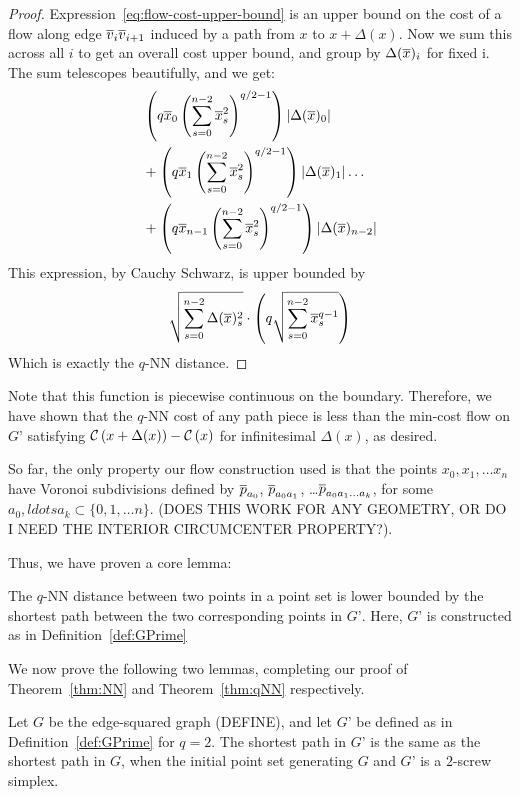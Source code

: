 \begin{proof}
Expression~\ref{eq:flow-cost-upper-bound} is an upper bound on the cost of
a flow along edge $\overline{v}_i\overline{v}_{i+1}$ induced by a path from $x$ to $x+\Delta(x)$. Now we sum this across all $i$ to get an overall cost upper bound, and group by
$\Delta(\overline{x})_i$ for fixed i. The sum telescopes beautifully, and we get:
\begin{align}
&\left(q\overline{x}_0\left(\sum_{s=0}^{n-2} \overline{x}_s^2\right)^{q/2-1}\right)| \Delta(\overline{x})_0|
\\&+
\left(q\overline{x}_1\left(\sum_{s=0}^{n-2} \overline{x}_s^2\right)^{q/2-1}\right)| \Delta(\overline{x})_1|
\ldots
\\& +
\left(q\overline{x}_{n-1}\left(\sum_{s=0}^{n-2} \overline{x}_s^2\right)^{q/2-1}\right)| \Delta(\overline{x})_{n-2}|
\end{align}
This expression, by Cauchy Schwarz, is upper bounded by
\[
\sqrt{\sum_{s=0}^{n-2} \Delta(\overline{x})_s^2} \cdot \left(q\sqrt{\sum_{s=0}^{n-2}
\overline{x}_s^{q-1}}\right)
\]
Which is exactly the $q$-NN distance.

\end{proof}

Note that this function is piecewise continuous on the boundary. Therefore,
we have shown that the $q$-NN cost of any path piece is less than the
min-cost flow on $G’$ satisfying
$\mathcal{C}\left(x+\Delta(x)\right)-\mathcal{C}\left(x\right)$ for infinitesimal
$\Delta(x)$, as desired.

So far, the only property our flow construction used is that the points
$x_0, x_1, \ldots x_n$ have Voronoi subdivisions defined by $\overline{p}_{a_0}$,
$\overline{p}_{a_0a_1}$, \ldots $\overline{p}_{a_0a_1\ldots a_k}$, for some $a_0, ldots a_k
\subset \{0, 1, \ldots n\}$. (DOES THIS WORK FOR ANY GEOMETRY, OR DO I NEED
THE INTERIOR CIRCUMCENTER PROPERTY?).

Thus, we have proven a core lemma:

\begin{lemma}\label{lem:qNN-GPrime}

The $q$-NN distance between two points in a point set is lower bounded by
the shortest path between the two corresponding points in $G’$. Here, $G’$
is constructed as in Definition~\ref{def:GPrime}

\end{lemma}

We now prove the following two lemmas, completing our proof of
Theorem~\ref{thm:NN} and Theorem~\ref{thm:qNN} respectively.

\begin{lemma}\label{lem:edge-squared-GPrime} Let $G$ be the edge-squared graph
(DEFINE), and let $G’$ be defined as in Definition~\ref{def:GPrime} for $q=2$.
The shortest path in $G’$ is the same as the shortest path in $G$, when the
initial point set generating $G$ and $G’$ is a $2$-screw simplex.

\end{lemma}

